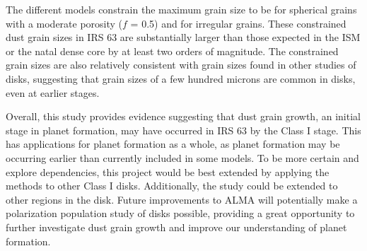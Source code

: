 The different models constrain the maximum grain size to be \sbest for spherical grains with a moderate porosity ($f$ = 0.5) and \ibest for irregular grains. These constrained dust grain sizes in IRS 63 are substantially larger than those expected in the ISM or the natal dense core by at least two orders of magnitude. The constrained grain sizes are also relatively consistent with grain sizes found in other studies of disks, suggesting that grain sizes of a few hundred microns are common in disks, even at earlier stages.






Overall, this study provides evidence suggesting that dust grain growth, an initial stage in planet formation, may have occurred in IRS 63 by the Class I stage. This has applications for planet formation as a whole, as planet formation may be occurring earlier than currently included in some models. To be more certain and explore dependencies, this project would be best extended by applying the methods to other Class I disks. Additionally, the study could be extended to other regions in the disk. Future improvements to ALMA will potentially make a polarization population study of disks possible, providing a great opportunity to further investigate dust grain growth and improve our understanding of planet formation.
